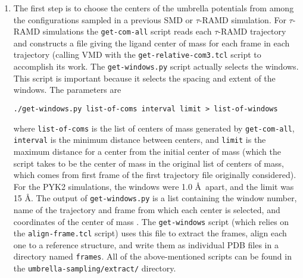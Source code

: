 \documentclass{article}      %
\begin{document}
\begin{enumerate}
\item The first step is to choose the centers of the umbrella potentials from among the configurations sampled in a previous SMD or $\tau$-RAMD simulation.  For $\tau$-RAMD simulations  the \verb+get-com-all+  script reads each $\tau$-RAMD trajectory and constructs a file giving the ligand center of mass for each frame in each trajectory (calling VMD with the \verb+get-relative-com3.tcl+ script to accomplish its work.  The \verb+get-windows.py+ script actually selects the windows.  This script is important because it selects the spacing and extent of the windows.  The parameters are
\begin{verbatim}
./get-windows.py list-of-coms interval limit > list-of-windows
\end{verbatim}
where \verb+list-of-coms+ is the list of centers of mass generated by \verb+get-com-all+, \verb+interval+ is the minimum distance between centers, and \verb+limit+ is the maximum distance for a center from the initial center of mass (which the script takes to be the center of mass in the original list of centers of mass, which comes from first frame of the first trajectory file originally considered).   For the PYK2 simulations, the windows were 1.0 \AA\ apart, and the limit was 15 \AA. The output of \verb+get-windows.py+ is a list containing the window number, name of the trajectory and frame from which each center is selected, and coordinates of the center of mass .   The \verb+get-windows+ script (which relies on the \verb+align-frame.tcl+ script) uses this file to extract the frames, align each one to a reference structure, and write them as individual PDB files in a directory named \verb+frames+.   All of the above-mentioned scripts can be found in the \verb+umbrella-sampling/extract/+ directory.


\end{enumerate}
\end{document}
